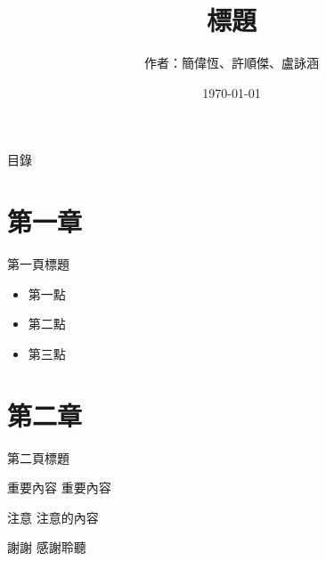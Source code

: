 \documentclass{beamer}
\title{標題}
\author{作者：簡偉恆、許順傑、盧詠涵}
\institute{輔仁大學}
\date{\today}
\begin{document}
\begin{frame}
    \titlepage
\end{frame}

\begin{frame}{目錄}
    \tableofcontents
\end{frame}

\section{第一章}
\begin{frame}{第一頁標題}
    \begin{itemize}
        \item 第一點
        \item 第二點
        \item 第三點
    \end{itemize}
\end{frame}

\section{第二章}
\begin{frame}{第二頁標題}
    \begin{block}{重要內容}
        重要內容
    \end{block}
    
    \begin{alertblock}{注意}
        注意的內容
    \end{alertblock}
\end{frame}

\begin{frame}{謝謝}
    \centering
    感謝聆聽
\end{frame}
\end{document}
